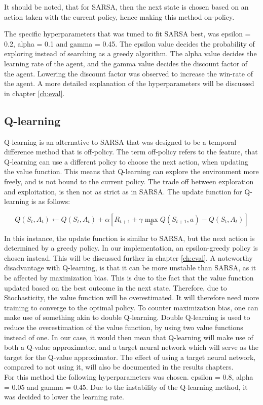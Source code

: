 It should be noted, that for SARSA, then the next state is chosen based on an action taken with the current policy, hence making this method on-policy.

The specific hyperparameters that was tuned to fit SARSA best, was epsilon = 0.2, alpha = 0.1 and gamma = 0.45. The epsilon value decides the probability of exploring instead of searching as a greedy algorithm. The alpha value decides the learning rate of the agent, and the gamma value decides the discount factor of the agent. Lowering the discount factor was observed to increase the win-rate of the agent. A more detailed explanation of the hyperparameters will be discussed in chapter \ref{ch:eval}.

\subsection{Q-learning} \label{sec:Q-learning}
Q-learning is an alternative to SARSA that was designed to be a temporal difference method that is off-policy. The term off-policy refers to the feature, that Q-learning can use a different policy to choose the next action, when updating the value function. This means that Q-learning can explore the environment more freely, and is not bound to the current policy. The trade off between exploration and exploitation, is then not as strict as in SARSA. The update function for Q-learning is as follows:

\begin{equation}
    Q(S_t, A_t) \leftarrow Q(S_t, A_t) + \alpha \left[ R_{t+1} + \gamma \max_a Q(S_{t+1}, a) - Q(S_t, A_t) \right]
\end{equation}

In this instance, the update function is similar to SARSA, but the next action is determined by a greedy policy. In our implementation, an epsilon-greedy policy is chosen instead. This will be discussed further in chapter \ref{ch:eval}. A noteworthy disadvantage with Q-learning, is that it can be more unstable than SARSA, as it be affected by maximization bias. This is due to the fact that the value function updated based on the best outcome in the next state. Therefore, due to Stochasticity, the value function will be overestimated. It will therefore need more training to converge to the optimal policy. To counter maximization bias, one can make use of something akin to double Q-learning. Double Q-learning is used to reduce the overestimation of the value function, by using two value functions instead of one. In our case, it would then mean that Q-learning will make use of both a Q-value approximator, and a target neural network which will serve as the target for the Q-value approximator. The effect of using a target neural network, compared to not using it, will also be documented in the results chapters.\\
For this method the following hyperparameters was chosen. epsilon = 0.8, alpha = 0.05 and gamma = 0.45. Due to the instability of the Q-learning method, it was decided to lower the learning rate. 



